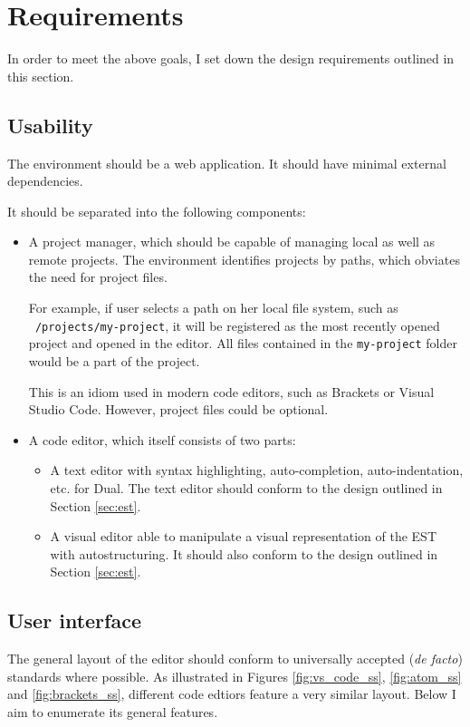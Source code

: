 \section{Requirements}
In order to meet the above goals, I set down the design requirements outlined in this section.

\subsection{Usability}
The environment should be a web application. It should have minimal external dependencies.

It should be separated into the following components:
\begin{itemize}
\item A project manager, which should be capable of managing local as well as remote projects. The environment identifies projects by paths, which obviates the need for project files.

For example, if user selects a path on her local file system, such as \texttt{~/projects/my-project}, it will be registered as the most recently opened project and opened in the editor. All files contained in the \texttt{my-project} folder would be a part of the project.

This is an idiom used in modern code editors, such as Brackets or Visual Studio Code. However, project files could be optional.

\item A code editor, which itself consists of two parts:
    \begin{itemize}
    \item A text editor with syntax highlighting, auto-completion, auto-indentation, etc. for Dual. The text editor should conform to the design outlined in Section \ref{sec:est}.
    \item A visual editor able to manipulate a visual representation of the EST  with autostructuring. It should also conform to the design outlined in Section \ref{sec:est}.
    \end{itemize}
\end{itemize}


\subsection{User interface}
The general layout of the editor should conform to universally accepted (\textit{de facto}) standards where possible. As illustrated in Figures \ref{fig:vs_code_ss}, \ref{fig:atom_ss} and \ref{fig:brackets_ss}, different code edtiors feature a very similar layout. Below I aim to enumerate its general features.

